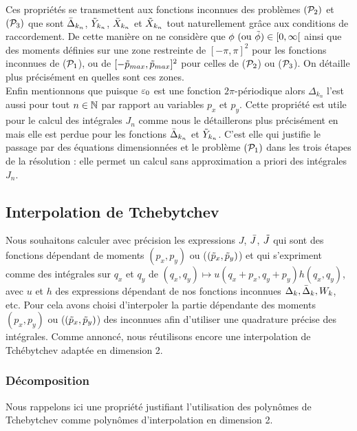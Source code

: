 \documentclass[10.5pt]{article}
\begin{document}
\begin{multicols}{2}
Ces propriétés se transmettent aux fonctions inconnues des problèmes $(\mathcal{P}_2)$ et $(\mathcal{P}_3)$ que sont $\bar{\Delta}_{k_n}$, $\tilde{Y}_{k_n}$, $\bar{X}_{k_n}$ et $\tilde{X}_{k_n}$ tout naturellement grâce aux conditions de raccordement.
De cette manière on ne considère que $\phi \text{ (ou } \tilde{\phi}) \in [0, \infty[$ ainsi que des moments définies sur une zone restreinte de $[-\pi, \pi]^2$ pour les fonctions inconnues de ($\mathcal{P}_1$), ou de $[-\tilde{p}_{max}, \tilde{p}_{max}]^2$ pour celles de ($\mathcal{P}_2$) ou ($\mathcal{P}_3$). On détaille plus précisément en  quelles sont ces zones. \\
\indent
 Enfin mentionnons que puisque $\varepsilon_0$ est une fonction $2\pi$-périodique alors $\Delta_{k_n}$ l'est aussi pour tout $n\in\mathbb{N}$ par rapport au variables $p_x$ et $p_y$. Cette propriété est utile pour le calcul des intégrales $J_n$ comme nous le détaillerons plus précisément en  mais elle est perdue pour les fonctions $\bar{\Delta}_{k_n}$ et $\tilde{Y}_{k_n}$. C'est elle qui justifie le passage par des équations dimensionnées et le problème $(\mathcal{P}_1)$ dans les trois étapes de la résolution : elle permet un calcul sans approximation a priori des intégrales $J_n$.





\subsection{Interpolation de Tchebytchev}

Nous souhaitons calculer avec précision les expressions $J$, $\bar{J}$, $\tilde{J}$ qui sont des fonctions dépendant de moments $(p_x, p_y)$ ou ($(\tilde{p}_x, \tilde{p}_y)$) et qui s'expriment comme des intégrales sur $q_x$ et $q_y$ de $(q_x, q_y) \mapsto u(q_x + p_{x}, q_y + p_{y})h(q_x, q_y)$, avec $u$ et $h$ des expressions dépendant de nos fonctions inconnues $\Delta_k, \bar{\Delta}_k, W_k$, etc. Pour cela avons choisi d'interpoler la partie dépendante des moments $(p_x, p_y)$ ou ($(\tilde{p}_x, \tilde{p}_y)$) des inconnues afin d'utiliser une quadrature précise des intégrales. Comme annoncé, nous réutilisons encore une interpolation de Tchébytchev adaptée en dimension 2. 

\subsubsection{Décomposition}

Nous rappelons ici une propriété justifiant l'utilisation des polynômes de Tchebytchev comme polynômes d'interpolation en dimension 2.\\


\end{multicols}
\end{document}

